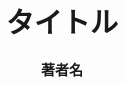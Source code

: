 \documentclass{article}
\begin{document}
\renewcommand{\baselinestretch}{1.4}
\renewcommand{\arraystretch}{0.9}

\usepackage{fancybox}

\newcommand{\reibun}{\ovalbox{\small 例}}

\newcommand{\entry}[5]{\hangindent = 1cm
\textbf{#1}\ \textbf{\ipa{#2}}{【#3】}\ {#4}{#5}
\markboth{#1}{#1}}

\newcommand{\ctd}[2]{\hspace{0.5cm}{#1}{#2}}

\title{\Huge \bf タイトル}
\author{\huge \bf 著者名}
\date{}

\end{document}
